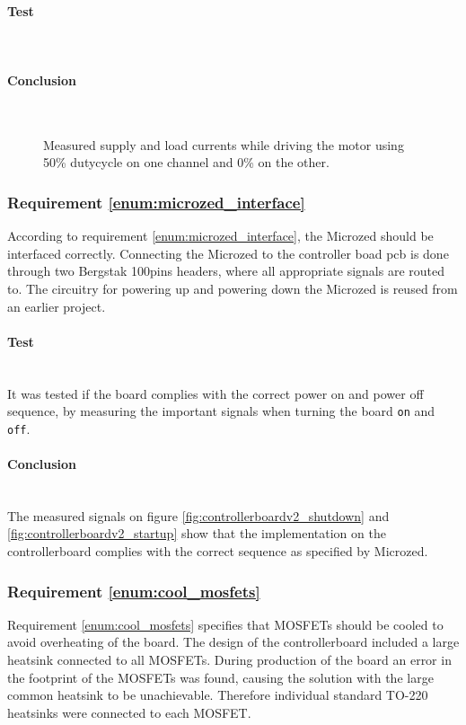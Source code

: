 \paragraph{Test}~\\

\paragraph{Conclusion}~\\
\begin{figure}[h]
	\centering
    
	\caption[Measured supply and load currents.]{Measured supply and load currents while driving the motor using 50\% dutycycle on one channel and 0\% on the other.}
	\label{fig:controllerboardv2_}
\end{figure}


\subsubsection{Requirement \ref{enum:microzed_interface}} %
\label{ssub:requirement_enum:microzed_interface}
According to requirement  \ref{enum:microzed_interface}, the Microzed should be interfaced correctly.
Connecting the Microzed to the controller boad pcb is done through two Bergstak 100pins headers, where all appropriate signals are routed to.
The circuitry for powering up and powering down the Microzed is reused from an earlier project.

\paragraph{Test}~\\
It was tested if the board complies with the correct power on and power off sequence, by measuring the important signals when turning the board \texttt{on} and \texttt{off}.

\paragraph{Conclusion}~\\
The measured signals on figure \ref{fig:controllerboardv2_shutdown} and \ref{fig:controllerboardv2_startup} show that the implementation on the controllerboard complies with the correct sequence as specified by Microzed.


\subsubsection{Requirement \ref{enum:cool_mosfets}} %
\label{ssub:requirement_ref_enum:cool_mosfets}
Requirement \ref{enum:cool_mosfets} specifies that MOSFETs should be cooled to avoid overheating of the board. 
The design of the controllerboard included a large heatsink connected to all MOSFETs. 
During production of the board an error in the footprint of the MOSFETs was found, causing the solution with the large common heatsink to be unachievable.
Therefore individual standard TO-220 heatsinks were connected to each MOSFET.

